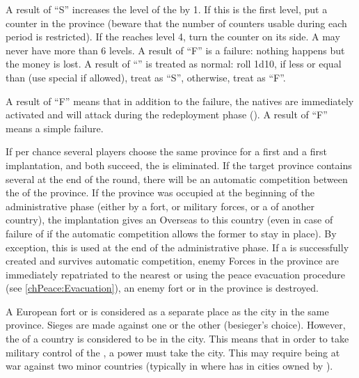 \bparag A result of ``S'' increases the level of the \TP by 1. If this is the
first level, put a counter in the province (beware that the number of counters
usable during each period is restricted). If the \TP reaches level 4, turn the
counter on its \Faceplus side. A \TP may never have more than 6 levels.
\bparag A result of ``F'' is a failure: nothing happens but the money is lost.
\bparag A result of ``\undemi'' is treated as normal: roll 1d10, if less or
equal than \FTI (use special \FTI if allowed), treat as ``S'', otherwise,
treat as ``F''.

\label{chAdministration:TP:Critical failure} A result
of ``F\textetoile'' means that in addition to the failure, the natives are
immediately activated and will attack during the redeployment phase
(). A result of ``F'' means a simple failure.

\bparag If per chance several players choose the same province for a first
\COL and a first \TP implantation, and both succeed, the \TP is eliminated.
\bparag If the target province contains several \TP at the end of the round,
there will be an automatic competition between the \TP of the province.
\bparag If the province was occupied at the beginning of the administrative
phase (either by a fort, or military forces, or a \TP of another country), the
implantation gives an Overseas \CB to this country (even in case of failure of
if the automatic competition allows the former \TP to stay in place). By
exception, this \CB is used at the end of the administrative phase.
\bparag If a \TP is successfully created and survives automatic competition,
enemy Forces in the province are immediately repatriated to the nearest \TP or
\COL using the peace evacuation procedure (see \ref{chPeace:Evacuation}), an
enemy fort or \TP in the province is destroyed.

 A European fort or \TP is considered
as a separate place as the city in the same province. Sieges are made against
one or the other (besieger's choice).
\bparag However, the \TP of a \ROTW country is considered to be in the
city. This means that in order to take military control of the \TP, a power
must take the city. This may require being at war against two minor countries
(typically in  where \paysGujerat has \TP in cities owned by
\paysVijayanagar).

